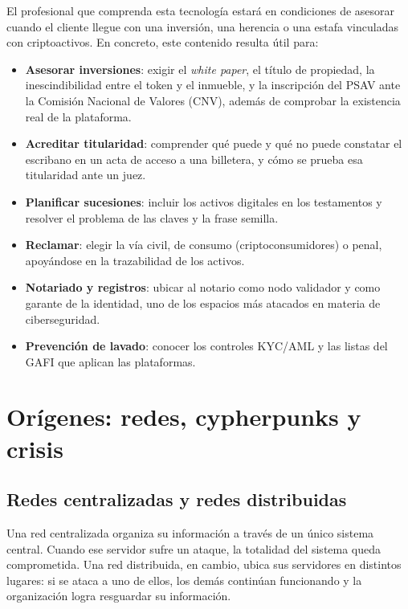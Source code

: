 \documentclass[12pt,oneside]{book}
\begin{document}
\begin{important}
El profesional que comprenda esta tecnología estará en condiciones de asesorar cuando el cliente llegue con una inversión, una herencia o una estafa vinculadas con criptoactivos. En concreto, este contenido resulta útil para:
\begin{itemize}
    \item \textbf{Asesorar inversiones}: exigir el \textit{white paper}, el título de propiedad, la inescindibilidad entre el token y el inmueble, y la inscripción del PSAV ante la Comisión Nacional de Valores (CNV), además de comprobar la existencia real de la plataforma.
    \item \textbf{Acreditar titularidad}: comprender qué puede y qué no puede constatar el escribano en un acta de acceso a una billetera, y cómo se prueba esa titularidad ante un juez.
    \item \textbf{Planificar sucesiones}: incluir los activos digitales en los testamentos y resolver el problema de las claves y la frase semilla.
    \item \textbf{Reclamar}: elegir la vía civil, de consumo (criptoconsumidores) o penal, apoyándose en la trazabilidad de los activos.
    \item \textbf{Notariado y registros}: ubicar al notario como nodo validador y como garante de la identidad, uno de los espacios más atacados en materia de ciberseguridad.
    \item \textbf{Prevención de lavado}: conocer los controles KYC/AML y las listas del GAFI que aplican las plataformas.
\end{itemize}
\end{important}

\chapter{Orígenes: redes, cypherpunks y crisis}

\section{Redes centralizadas y redes distribuidas}

Una red centralizada organiza su información a través de un único sistema central. Cuando ese servidor sufre un ataque, la totalidad del sistema queda comprometida. Una red distribuida, en cambio, ubica sus servidores en distintos lugares: si se ataca a uno de ellos, los demás continúan funcionando y la organización logra resguardar su información.
\end{document}
